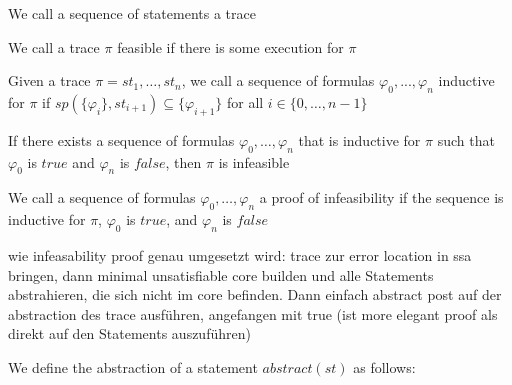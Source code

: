 \documentclass[landscape, a4paper]{article}
\begin{document}
\begin{minipage}[t]{0.2\linewidth}
\begin{betterlist}
		\item \color{orange}We call a sequence of statements a \alert{trace}\color{black}
		\begin{betterlist}
			\item We call a trace $\pi$ \alert{feasible} if there is some execution for $\pi$
		\end{betterlist}
		\item \color{orange}Given a trace $\pi = st_1, \ldots, st_n$, we call a \alert{sequence of formulas} $\varphi_0, . . . , \varphi_n$ \alert{inductive for $\pi$} if $sp(\{\varphi_i\}, st_{i+1}) \subseteq \{\varphi_{i+1}\}$ for all $i \in \{0, \ldots, n−1\}$\color{black} %
		\item If there exists a sequence of formulas $\varphi_0, \ldots , \varphi_n$ that is inductive for $\pi$ such that $\varphi_0$ is $true$ and $\varphi_n$ is $false$, then $\pi$ is infeasible
		\item \color{orange}We call a sequence of formulas $\varphi_0, \ldots , \varphi_n$ a \alert{proof of infeasibility} if the sequence is inductive for $\pi$, $\varphi_0$ is $true$, and $\varphi_n$ is $false$\color{black}
		\begin{betterlist}
			\item \alert{wie infeasability proof genau umgesetzt wird:} trace zur error location in ssa bringen, dann minimal unsatisfiable core builden und alle Statements abstrahieren, die sich nicht im core befinden. Dann einfach abstract post auf der abstraction des trace ausführen, angefangen mit true (ist more elegant proof als direkt auf den Statements auszuführen)
		\end{betterlist}

		\item We define the \alert{abstraction of a statement} $abstract(st)$ as follows:


\end{betterlist}
\end{minipage}
\end{document}
